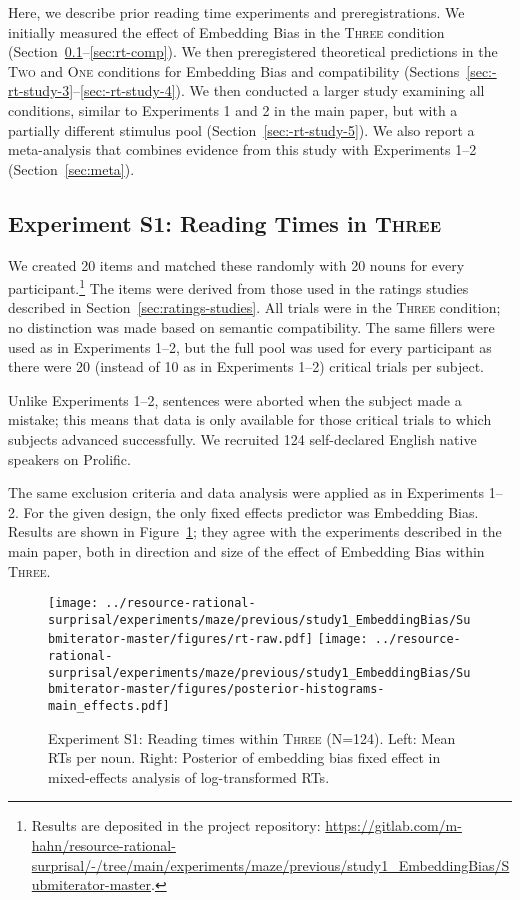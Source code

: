 
Here, we describe prior reading time experiments and preregistrations.
We initially measured the effect of Embedding Bias in the \textsc{Three} condition (Section~\ref{sec:rt-three}--\ref{sec:rt-comp}).
We then preregistered theoretical predictions in the \textsc{Two} and \textsc{One} conditions for Embedding Bias and compatibility (Sections~\ref{sec:-rt-study-3}--\ref{sec:-rt-study-4}).
We then conducted a larger study examining all conditions, similar to Experiments 1 and 2 in the main paper, but with a partially different stimulus pool (Section~\ref{sec:-rt-study-5}).
We also report a meta-analysis that combines evidence from this study with Experiments 1--2 (Section~\ref{sec:meta}).

\subsection{Experiment S1: Reading Times in \textsc{Three}}\label{sec:rt-three}

We created 20 items and matched these randomly with 20 nouns for every participant.\footnote{Results are deposited in the project repository: \url{https://gitlab.com/m-hahn/resource-rational-surprisal/-/tree/main/experiments/maze/previous/study1_EmbeddingBias/Submiterator-master}.}
The items were derived from those used in the ratings studies described in Section~\ref{sec:ratings-studies}.
All trials were in the \textsc{Three} condition; no distinction was made based on semantic compatibility.
The same fillers were used as in Experiments 1--2, but the full pool was used for every participant as there were 20 (instead of 10 as in Experiments 1--2) critical trials per subject.

Unlike Experiments 1--2, sentences were aborted when the subject made a mistake; this means that data is only available for those critical trials to which subjects advanced successfully.
We recruited 124 self-declared English native speakers on Prolific.

The same exclusion criteria and data analysis were applied as in Experiments 1--2.
For the given design, the only fixed effects predictor was Embedding Bias.
Results are shown in Figure~\ref{fig:expt-s1}; they agree with the experiments described in the main paper, both in direction and size of the effect of Embedding Bias within \textsc{Three}.


\begin{figure}
	\centering

	\texttt{[image: ../resource-rational-surprisal/experiments/maze/previous/study1\_EmbeddingBias/Submiterator-master/figures/rt-raw.pdf]}
	\texttt{[image: ../resource-rational-surprisal/experiments/maze/previous/study1\_EmbeddingBias/Submiterator-master/figures/posterior-histograms-main\_effects.pdf]}

	\caption{Experiment S1: Reading times within \textsc{Three} (N=124).  Left: Mean RTs per noun. Right: Posterior of embedding bias fixed effect in mixed-effects analysis of log-transformed RTs. }\label{fig:expt-s1}
\end{figure}

